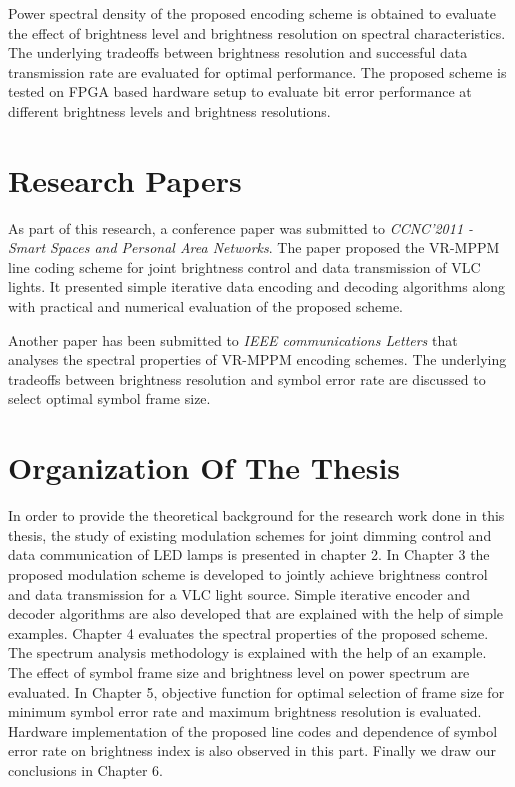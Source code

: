 Power spectral density of the proposed encoding scheme is obtained to evaluate the effect of brightness level and brightness resolution on spectral characteristics. The underlying tradeoffs between brightness resolution and successful data transmission rate are evaluated for optimal performance. The proposed scheme is tested on FPGA based hardware setup to evaluate bit error performance at different brightness levels and brightness resolutions.

\section{Research Papers}
As part of this research, a conference paper \cite{siddique2011joint} was submitted to \emph{CCNC'2011 - Smart Spaces and Personal Area Networks}. The paper proposed the VR-MPPM line coding scheme for joint brightness control and data transmission of VLC lights. It presented simple iterative data encoding and decoding algorithms along with practical and numerical evaluation of the proposed scheme.

Another paper has been submitted to \emph{IEEE communications Letters} that analyses the spectral properties of VR-MPPM encoding schemes. The underlying tradeoffs between brightness resolution and symbol error rate are discussed to select optimal symbol frame size.

\section{Organization Of The Thesis}
In order to provide the theoretical background for the research work done in this thesis, the study of existing modulation schemes for joint dimming control and data communication of LED lamps is presented in chapter 2. In Chapter 3 the proposed modulation scheme is developed to jointly achieve brightness control and data transmission for a VLC light source. Simple iterative encoder and decoder algorithms are also developed that are explained with the help of simple examples. Chapter 4 evaluates the spectral properties of the proposed scheme. The spectrum analysis methodology is explained with the help of an example. The effect of symbol frame size and brightness level on power spectrum are evaluated. In Chapter 5, objective function for optimal selection of frame size for minimum symbol error rate and maximum brightness resolution is evaluated. Hardware implementation of the proposed line codes and dependence of symbol error rate on brightness index is  also observed in this part. Finally we draw our conclusions in Chapter 6.

